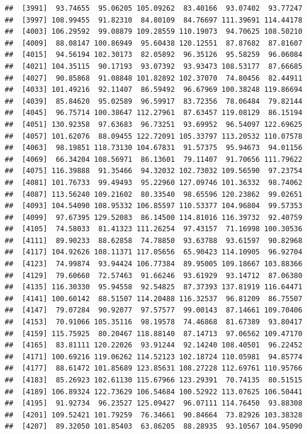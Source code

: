 \documentclass[
]{article}
\begin{document}
\begin{verbatim}
##  [3991]  93.74655  95.06205 105.09262  83.40166  93.07402  93.77247
##  [3997] 108.99455  91.82310  84.80109  84.76697 111.39691 114.44178
##  [4003] 106.29592  99.08879 109.28559 110.19073  94.70625 108.50210
##  [4009]  88.08147 100.86949  95.60438 120.12551  87.87682  87.81607
##  [4015]  94.56194 102.30173  82.05892  96.35126  95.58259  96.06084
##  [4021] 104.35115  90.17193  93.07392  93.93473 108.53177  87.66685
##  [4027]  90.85868  91.08848 101.82892 102.37070  74.80456  82.44911
##  [4033] 101.49216  92.11407  86.59492  96.67969 100.38248 119.86694
##  [4039]  85.84620  95.02589  96.59917  83.72356  78.06484  79.82144
##  [4045]  96.75714 100.38647 112.27961  87.63457 119.08129  86.15194
##  [4051] 130.92358  97.63683  96.73251  93.69952  96.54097 122.69625
##  [4057] 101.62076  88.09455 122.72091 105.33797 113.20532 110.07578
##  [4063]  98.19851 118.73130 104.67831  91.57375  95.94673  94.01156
##  [4069]  66.34204 108.56971  86.13601  79.11407  91.70656 111.79622
##  [4075] 116.39888  91.35466  94.32032 102.73032 109.56590  97.23754
##  [4081] 101.76733  99.49493  95.22960 127.09746 101.36332  98.74062
##  [4087] 113.56240 109.21602  80.33540  98.65596 120.23862  99.02651
##  [4093] 104.54090 108.95332 106.85597 110.53377 104.96804  99.57353
##  [4099]  97.67395 129.52083  86.14500 114.81016 116.39732  92.40759
##  [4105]  74.58033  81.41323 111.26254  97.43157  71.16998 100.30536
##  [4111]  89.90233  88.62858  74.78850  93.63788  93.61597  90.82968
##  [4117] 104.92626 108.11371 117.05656  65.90423 114.10905  96.92704
##  [4123]  74.99874  93.94424 106.77384  89.95005 109.18667 103.88366
##  [4129]  79.60660  72.57463  91.66246  93.61929  93.14712  87.06380
##  [4135] 116.30330  95.94558  92.54825  87.37393 137.81919 116.64471
##  [4141] 100.60142  88.51507 114.20488 116.32537  96.81209  86.75507
##  [4147]  79.07284  90.92077  97.57577  99.00143  87.14661 109.70406
##  [4153]  70.91066 105.35116  98.19578  74.46868  81.67389  93.80417
##  [4159] 115.75925  80.20467 118.88140  87.14713  97.06562 109.47170
##  [4165]  83.81111 120.22026  93.91244  92.14240 108.40501  96.22452
##  [4171] 100.69216 119.06262 114.52123 102.18724 110.05981  94.85774
##  [4177]  88.61472 101.85689 123.85631 108.27228 112.69761 110.95766
##  [4183]  85.26923 102.61130 115.67966 123.29391  70.74135  80.51515
##  [4189] 106.89324 122.73629 106.54684 100.52922 113.07625 106.50441
##  [4195]  91.92734  96.23527 125.09427  96.07111 114.76450  93.88308
##  [4201] 109.52421 101.79259  76.34661  90.84664  73.82926 103.38328
##  [4207]  89.32050 101.85403  63.86205  88.28935  93.10567 104.95090

\end{verbatim}
\end{document}
